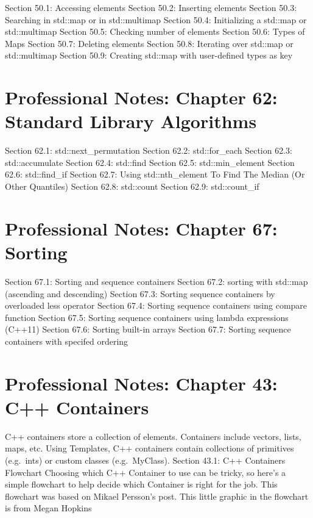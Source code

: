 Section 50.1: Accessing elements Section 50.2: Inserting elements
Section 50.3: Searching in std::map or in std::multimap Section 50.4:
Initializing a std::map or std::multimap Section 50.5: Checking number
of elements Section 50.6: Types of Maps Section 50.7: Deleting elements
Section 50.8: Iterating over std::map or std::multimap Section 50.9:
Creating std::map with user-deﬁned types as key

\hypertarget{professional-notes-chapter-62-standard-library-algorithms}{%
\chapter{Professional Notes: Chapter 62: Standard Library
Algorithms}\label{professional-notes-chapter-62-standard-library-algorithms}}

Section 62.1: std::next\_permutation Section 62.2: std::for\_each
Section 62.3: std::accumulate Section 62.4: std::ﬁnd Section 62.5:
std::min\_element Section 62.6: std::ﬁnd\_if Section 62.7: Using
std::nth\_element To Find The Median (Or Other Quantiles) Section 62.8:
std::count Section 62.9: std::count\_if

\hypertarget{professional-notes-chapter-67-sorting}{%
\chapter{Professional Notes: Chapter 67:
Sorting}\label{professional-notes-chapter-67-sorting}}

Section 67.1: Sorting and sequence containers Section 67.2: sorting with
std::map (ascending and descending) Section 67.3: Sorting sequence
containers by overloaded less operator Section 67.4: Sorting sequence
containers using compare function Section 67.5: Sorting sequence
containers using lambda expressions (C++11) Section 67.6: Sorting
built-in arrays Section 67.7: Sorting sequence containers with specifed
ordering

\hypertarget{professional-notes-chapter-43-c-containers}{%
\chapter{Professional Notes: Chapter 43: C++
Containers}\label{professional-notes-chapter-43-c-containers}}

C++ containers store a collection of elements. Containers include
vectors, lists, maps, etc. Using Templates, C++ containers contain
collections of primitives (e.g.~ints) or custom classes (e.g.~MyClass).
Section 43.1: C++ Containers Flowchart Choosing which C++ Container to
use can be tricky, so here's a simple ﬂowchart to help decide which
Container is right for the job. This ﬂowchart was based on Mikael
Persson's post. This little graphic in the ﬂowchart is from Megan
Hopkins

